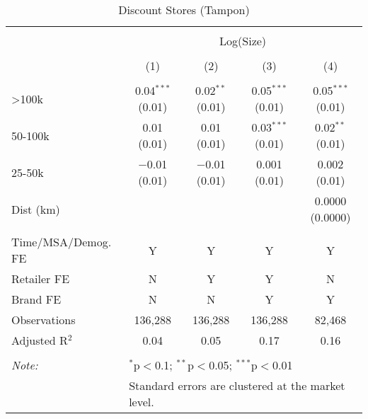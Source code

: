 
\begin{table}[!htbp] \centering 
  \caption{Discount Stores (Tampon)} 
  \label{tab:packageSizeDiscountTampon} 
\begin{tabular}{@{\extracolsep{5pt}}lcccc} 
\\[-1.8ex]\hline 
\hline \\[-1.8ex] 
 & \multicolumn{4}{c}{Log(Size)} \\ 
\\[-1.8ex] & (1) & (2) & (3) & (4)\\ 
\hline \\[-1.8ex] 
 >100k & 0.04$^{***}$ (0.01) & 0.02$^{**}$ (0.01) & 0.05$^{***}$ (0.01) & 0.05$^{***}$ (0.01) \\ 
  50-100k & 0.01 (0.01) & 0.01 (0.01) & 0.03$^{***}$ (0.01) & 0.02$^{**}$ (0.01) \\ 
  25-50k & $-$0.01 (0.01) & $-$0.01 (0.01) & 0.001 (0.01) & 0.002 (0.01) \\ 
  Dist (km) &  &  &  & 0.0000 (0.0000) \\ 
 \hline \\[-1.8ex] 
Time/MSA/Demog. FE & Y & Y & Y & Y \\ 
Retailer FE & N & Y & Y & N \\ 
Brand FE & N & N & Y & Y \\ 
Observations & 136,288 & 136,288 & 136,288 & 82,468 \\ 
Adjusted R$^{2}$ & 0.04 & 0.05 & 0.17 & 0.16 \\ 
\hline 
\hline \\[-1.8ex] 
\textit{Note:}  & \multicolumn{4}{l}{$^{*}$p$<$0.1; $^{**}$p$<$0.05; $^{***}$p$<$0.01} \\ 
 & \multicolumn{4}{l}{Standard errors are clustered at the market level.} \\ 
\end{tabular} 
\end{table} 
